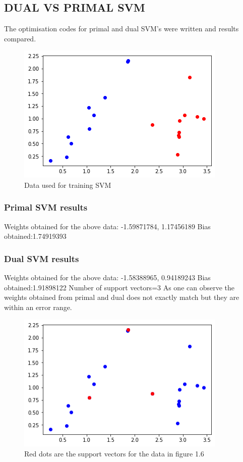 \documentclass[../main.tex]{subfiles}
\begin{document}
\subsection{DUAL VS PRIMAL SVM}
The optimisation codes for primal and dual SVM's were written and results compared. 
    \begin{figure}[htp]
    \centering
    \includegraphics[width=10cm]{H6.png}
    \caption{Data used for training SVM}
    \label{Data used for training SVM}
    \end{figure}
\subsubsection{Primal SVM results}
Weights obtained for the above data: -1.59871784,  1.17456189
Bias obtained:1.74919393
    
\subsubsection{Dual SVM results}
Weights obtained for the above data: -1.58388965,  0.94189243
Bias obtained:1.91898122
Number of support vectors=3
\newline 
As one can observe the weights obtained from primal and dual does not exactly match but they are within an error range.

    \begin{figure}[htp]
    \centering
    \includegraphics[width=10cm]{H7.png}
    \caption{Red dots are the support vectors for the data in figure 1.6}
    \label{Red dots are the support vectors for the data in figure 1.6}
    \end{figure}
\end{document}
